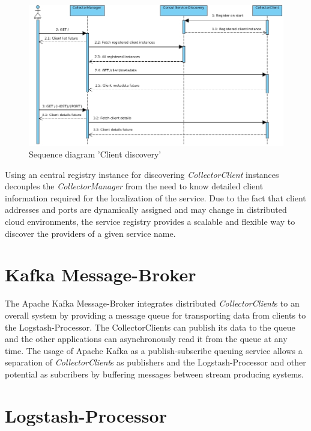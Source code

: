 \begin{figure}[H]
	\centering
	\includegraphics[width=1.0\textwidth]{../uml/sequence-discovery.jpg}
	\caption{Sequence diagram 'Client discovery'}
	\label{fig:sequence-client-discovery}
\end{figure}

Using an central registry instance for discovering \textit{CollectorClient} instances decouples the \textit{CollectorManager} from the
need to know detailed client information required for the localization of the service. Due to the fact that
client addresses and ports are dynamically assigned and may change in distributed cloud environments, the service registry provides
a scalable and flexible way to discover the providers of a given service name.

\section{Kafka Message-Broker}

The Apache Kafka Message-Broker integrates distributed \textit{CollectorClient}s to an overall system by providing a
message queue for transporting data from clients to the Logstash-Processor. The CollectorClients can publish
its data to the queue and the other applications can asynchronously read it from the queue at any time.
The usage of Apache Kafka as a publish-subscribe queuing service allows a separation of \textit{CollectorClient}s as publishers and the
Logstash-Processor and other potential as subcribers by buffering messages between stream producing systems.

\section{Logstash-Processor}
%

